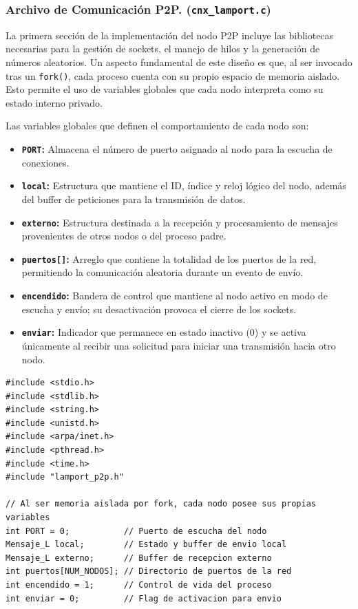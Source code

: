 \subsubsection{Archivo de Comunicación P2P. (\texttt{cnx\_lamport.c})}

La primera sección de la implementación del nodo P2P incluye las bibliotecas necesarias para la gestión de sockets, el manejo de hilos y la generación de números aleatorios. Un aspecto fundamental de este diseño es que, al ser invocado tras un \texttt{fork()}, cada proceso cuenta con su propio espacio de memoria aislado. Esto permite el uso de variables globales que cada nodo interpreta como su estado interno privado.

Las variables globales que definen el comportamiento de cada nodo son:

\begin{itemize}
    \item \textbf{\texttt{PORT}:} Almacena el número de puerto asignado al nodo para la escucha de conexiones.
    \item \textbf{\texttt{local}:} Estructura que mantiene el ID, índice y reloj lógico del nodo, además del buffer de peticiones para la transmisión de datos.
    \item \textbf{\texttt{externo}:} Estructura destinada a la recepción y procesamiento de mensajes provenientes de otros nodos o del proceso padre.
    \item \textbf{\texttt{puertos[]}:} Arreglo que contiene la totalidad de los puertos de la red, permitiendo la comunicación aleatoria durante un evento de envío.
    \item \textbf{\texttt{encendido}:} Bandera de control que mantiene al nodo activo en modo de escucha y envío; su desactivación provoca el cierre de los sockets.
    \item \textbf{\texttt{enviar}:} Indicador que permanece en estado inactivo ($0$) y se activa únicamente al recibir una solicitud para iniciar una transmisión hacia otro nodo.
\end{itemize}

\begin{lstlisting}[style=estiloC]
#include <stdio.h>
#include <stdlib.h>
#include <string.h>
#include <unistd.h>
#include <arpa/inet.h>
#include <pthread.h>
#include <time.h>
#include "lamport_p2p.h"

// Al ser memoria aislada por fork, cada nodo posee sus propias variables
int PORT = 0;           // Puerto de escucha del nodo
Mensaje_L local;        // Estado y buffer de envio local
Mensaje_L externo;      // Buffer de recepcion externo
int puertos[NUM_NODOS]; // Directorio de puertos de la red
int encendido = 1;      // Control de vida del proceso
int enviar = 0;         // Flag de activacion para envio
\end{lstlisting}

